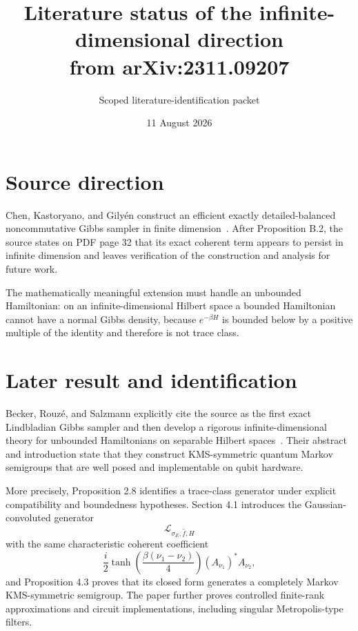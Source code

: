 \documentclass[11pt]{article}
\title{Literature status of the infinite-dimensional direction\\from arXiv:2311.09207}
\author{Scoped literature-identification packet}
\date{11 August 2026}
\begin{document}
\maketitle

\begin{center}
\end{center}

\section{Source direction}

Chen, Kastoryano, and Gily\'en construct an efficient exactly
detailed-balanced noncommutative Gibbs sampler in finite dimension~\cite{CKG}.
After Proposition B.2, the source states on PDF page 32 that its exact coherent
term appears to persist in infinite dimension and leaves verification of the
construction and analysis for future work.

The mathematically meaningful extension must handle an unbounded Hamiltonian:
on an infinite-dimensional Hilbert space a bounded Hamiltonian cannot have a
normal Gibbs density, because $e^{-\beta H}$ is bounded below by a positive
multiple of the identity and therefore is not trace class.

\section{Later result and identification}

Becker, Rouz\'e, and Salzmann explicitly cite the source as the first exact
Lindbladian Gibbs sampler and then develop a rigorous infinite-dimensional
theory for unbounded Hamiltonians on separable Hilbert spaces~\cite{BRS}.  Their
abstract and introduction state that they construct KMS-symmetric quantum
Markov semigroups that are well posed and implementable on qubit hardware.

More precisely, Proposition 2.8 identifies a trace-class generator under
explicit compatibility and boundedness hypotheses.  Section 4.1 introduces
the Gaussian-convoluted generator
\[
 \mathcal L_{\sigma_E,\widehat f,H}
\]
with the same characteristic coherent coefficient
\[
 \frac{i}{2}\tanh\!\left(\frac{\beta(\nu_1-\nu_2)}4\right)
 (A_{\nu_1})^*A_{\nu_2},
\]
and Proposition 4.3 proves that its closed form generates a completely Markov
KMS-symmetric semigroup.  The paper further proves controlled finite-rank
approximations and circuit implementations, including singular
Metropolis-type filters.
\end{document}
